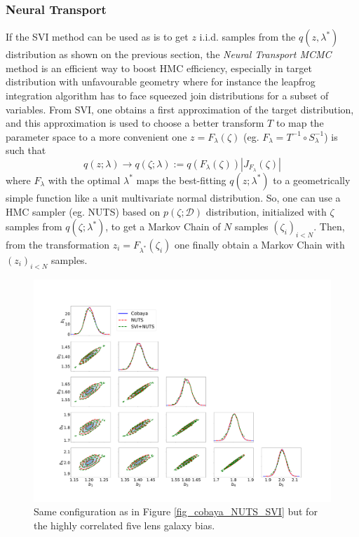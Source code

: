 \documentclass[twocolumn,twocolappendix,nofootinbib,iop]{openjournal}
\newcommand{\nblink}[1]{\href{https://github.com/DifferentiableUniverseInitiative/jax-cosmo-paper/blob/master/notebooks/#1.ipynb}{\faFileCodeO}}
\newcommand{\bydef}{:=}
\begin{document}
\subsubsection{Neural Transport}
\label{sec-Neural-Reparametrisation}
%
If the SVI method can be used as is to get $z$ i.i.d. samples from the $q(z,\lambda^\ast)$ distribution as shown on the previous section, the \textit{Neural Transport MCMC} method \citep{Parno2018,2019arXiv190303704H} is an efficient way to boost HMC efficiency, especially in target distribution with unfavourable geometry where for instance the leapfrog integration algorithm has to face squeezed join distributions for a subset of variables. From SVI, one obtains a first approximation of the target distribution, and this approximation is used to choose a better transform $T$ to map the parameter space to a more convenient one $z=F_\lambda(\zeta)$ (eg. $F_\lambda=T^{-1}\circ S^{-1}_\lambda$) is such that
\begin{equation}
q(z;\lambda) \rightarrow q(\zeta;\lambda) \bydef q(F_\lambda(\zeta)) |J_{F_\lambda}(\zeta)|
\end{equation}
where $F_\lambda$ with the optimal $\lambda^\ast$ maps the best-fitting $q(z;\lambda^\ast)$ to a geometrically simple function like a unit multivariate normal distribution.  So, one can use a HMC sampler (eg. NUTS) based on $p(\zeta;\mathcal{D})$ distribution, initialized with $\zeta$ samples from $q(\zeta;\lambda^\ast)$, to get a Markov Chain of $N$ samples $(\zeta_i)_{i<N}$. Then, from the transformation  $z_i=F_{\lambda^\ast}(\zeta_i)$ one finally obtain a Markov Chain with $(z_i)_{i<N}$ samples. %
\begin{figure}
\centering
\includegraphics[width=1.5\columnwidth]{figures/fig_Cobaya-NUTS-SVI200_bis_v1.pdf}
\caption{Same configuration as in Figure \ref{fig_cobaya_NUTS_SVI} but for the highly correlated five lens galaxy bias.}
\label{fig_cobaya_NUTS_SVI_bis}
\end{figure}
\end{document}
